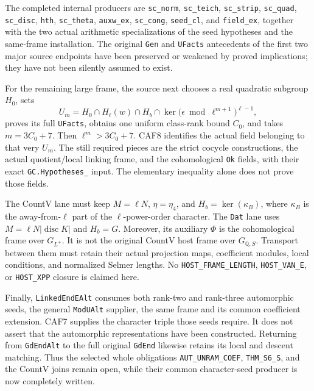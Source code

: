 \documentclass[11pt,a4paper]{article}
\numberwithin{equation}{section}
\theoremstyle{remark}\newtheorem{remark}[theorem]{Remark}
\begin{document}
The completed internal producers are \texttt{sc\_\allowbreak norm},
\texttt{sc\_\allowbreak teich}, \texttt{sc\_\allowbreak strip}, \texttt{sc\_\allowbreak quad},
\texttt{sc\_\allowbreak disc}, \texttt{hth}, \texttt{sc\_\allowbreak theta},
\texttt{auxw\_\allowbreak ex}, \texttt{sc\_\allowbreak cong}, \texttt{seed\_\allowbreak cl}, and
\texttt{field\_\allowbreak ex}, together with the two actual arithmetic
specializations of the seed hypotheses and the same-frame
installation.  The original \texttt{Gen} and \texttt{UFacts}
antecedents of the first two major source endpoints have been
preserved or weakened by proved implications; they have not been
silently assumed to exist.

For the remaining large frame, the source next chooses a real
quadratic subgroup \(H_0\), sets
\[
 U_m=H_0\cap H_\ell(w)\cap H_b\cap
          \ker\bigl(\epsilon\bmod\ell^{m+1}\bigr)^{\ell-1},
 \tag{CAF.16}
\]
proves its full \texttt{UFacts}, obtains one uniform class-rank
bound \(C_0\), and takes \(m=3C_0+7\).  Then
\(\ell^m>3C_0+7\).  CAF8 identifies the actual field belonging
to that very \(U_m\).  The still required pieces are the strict
cocycle constructions, the actual quotient/local linking frame,
and the cohomological \texttt{Ok} fields, with their exact
\texttt{GC.\allowbreak Hypotheses\_} input.  The elementary inequality alone
does not prove those fields.

The CountV lane must keep \(M=\ell N\), \(\eta=\eta_4\), and
\(H_b=\ker(\kappa_B)\), where \(\kappa_B\) is the away-from-\(\ell\)
part of the \(\ell\)-power-order character.  The \texttt{Dat}
lane uses \(M=\ell N|\operatorname{disc}K|\) and \(H_b=G\).
Moreover, its auxiliary \(\Phi\) is the cohomological frame over
\(G_{L^+}\).  It is not the original CountV host frame over
\(G_{\mathbb Q,S}\).  Transport between them must retain their
actual projection maps, coefficient modules, local conditions, and
normalized Selmer lengths.  No \texttt{HOST\_\allowbreak FRAME\_\allowbreak LENGTH},
\texttt{HOST\_\allowbreak VAN\_\allowbreak E}, or \texttt{HOST\_\allowbreak XPP} closure is claimed here.

Finally, \texttt{Linked\allowbreak End\allowbreak EAlt} consumes both rank-two and rank-three
automorphic seeds, the general \texttt{Mod\allowbreak UAlt} supplier, the same
frame and its common coefficient extension.  CAF7 supplies the
character triple those seeds require.  It does not assert that the
automorphic representations have been constructed.  Returning from
\texttt{Gd\allowbreak End\allowbreak Alt} to the full original \texttt{Gd\allowbreak End} likewise
retains its local and descent matching.  Thus the selected whole
obligations \texttt{AUT\_\allowbreak UNRAM\_\allowbreak COEF}, \texttt{THM\_\allowbreak S6\_\allowbreak S}, and
the CountV joins remain open, while their common character-seed
producer is now completely written.
\end{document}
